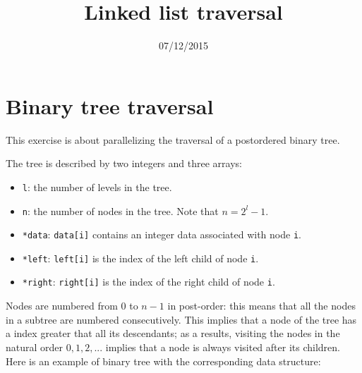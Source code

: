 \documentclass{article}
\title{Linked list traversal}
\date{07/12/2015}
\begin{document}
\maketitle

\section{Binary tree traversal}

This exercise is about parallelizing the traversal of a postordered
binary tree.

The tree is described by two integers and three arrays:

\begin{itemize}
\item \texttt{l}: the number of levels in the tree.
\item \texttt{n}: the number of nodes in the tree. Note that
  $n=2^l-1$.
\item \texttt{*data}: \texttt{data[i]} contains an integer data
  associated with node \texttt{i}.
\item \texttt{*left}: \texttt{left[i]} is the index of the left child
  of node \texttt{i}.
\item \texttt{*right}: \texttt{right[i]} is the index of the right child
  of node \texttt{i}.
\end{itemize}

Nodes are numbered from $0$ to $n-1$ in post-order: this means that
all the nodes in a subtree are numbered consecutively. This implies
that a node of the tree has a index greater that all its descendants;
as a results, visiting the nodes in the natural order $0, 1, 2, ...$
implies that a node is always visited after its children. Here is an
example of binary tree with the corresponding data structure:

\vspace{0.5cm}

\end{document}
